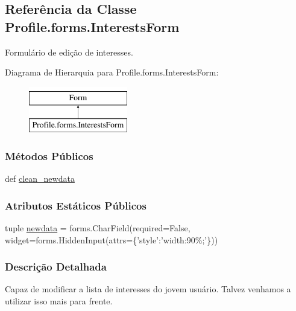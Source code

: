 \hypertarget{classProfile_1_1forms_1_1InterestsForm}{\subsection{Referência da Classe Profile.\-forms.\-Interests\-Form}
\label{classProfile_1_1forms_1_1InterestsForm}
}


Formulário de edição de interesses.  


Diagrama de Hierarquia para Profile.\-forms.\-Interests\-Form\-:\begin{figure}[H]
\begin{center}
\leavevmode
\includegraphics[height=2.000000cm]{d4/d5e/classProfile_1_1forms_1_1InterestsForm}
\end{center}
\end{figure}
\subsubsection*{Métodos Públicos}
\begin{DoxyCompactItemize}
\item 
def \hyperlink{classProfile_1_1forms_1_1InterestsForm_a6422167036a926576b18570db4da5117}{clean\-\_\-newdata}
\end{DoxyCompactItemize}
\subsubsection*{Atributos Estáticos Públicos}
\begin{DoxyCompactItemize}
\item 
tuple \hyperlink{classProfile_1_1forms_1_1InterestsForm_ad400f3a7b43e71bd7772fa85e2961ff0}{newdata} = forms.\-Char\-Field(required=False, widget=forms.\-Hidden\-Input(attrs=\{'style'\-:'width\-:90\%;'\}))
\end{DoxyCompactItemize}


\subsubsection{Descrição Detalhada}
Capaz de modificar a lista de interesses do jovem usuário. Talvez venhamos a utilizar isso mais para frente. 


